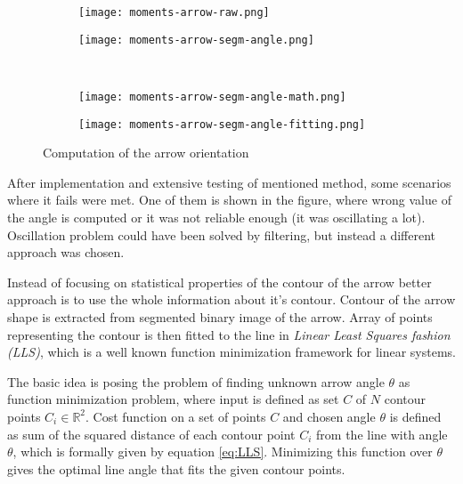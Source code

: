 \begin{figure}[th!]
	\centering
	\begin{subfigure}[b]{0.45\textwidth}
		\centering
		\texttt{[image: moments-arrow-raw.png]}
	\end{subfigure}
	\begin{subfigure}[b]{0.45\textwidth}
		\centering
		\texttt{[image: moments-arrow-segm-angle.png]}
	\end{subfigure}
	~
	\begin{subfigure}[b]{0.45\textwidth}
		\centering
		\texttt{[image: moments-arrow-segm-angle-math.png]}
	\end{subfigure}
	\begin{subfigure}[b]{0.45\textwidth}
		\centering
		\texttt{[image: moments-arrow-segm-angle-fitting.png]}
		\label{fig:line-fitting}
	\end{subfigure}
	\caption{Computation of the arrow orientation}
	\label{fig:arrow-angle-computation}
\end{figure}

After implementation and extensive testing of mentioned method, some scenarios where it fails were met. One of them is shown in the figure, where wrong value of the angle is computed or it was not reliable enough (it was oscillating a lot). Oscillation problem could have been solved by filtering, but instead a different approach was chosen.

Instead of focusing on statistical properties of the contour of the arrow better approach is to use the whole information about it's contour. Contour of the arrow shape is extracted from segmented binary image of the arrow. Array of points representing the contour is then fitted to the line in \textit{Linear Least Squares fashion (LLS)}, which is a well known function minimization framework for linear systems.

The basic idea is posing the problem of finding unknown arrow angle $\theta$ as function minimization problem, where input is defined as set $C$ of $N$ contour points $C_i \in \mathbb{R}^2$. Cost function on a set of points $C$ and chosen angle $\theta$ is defined as sum of the squared distance of each contour point $C_i$ from the line with angle $\theta$, which is formally given by equation \ref{eq:LLS}. Minimizing this function over $\theta$ gives the optimal line angle that fits the given contour points.

